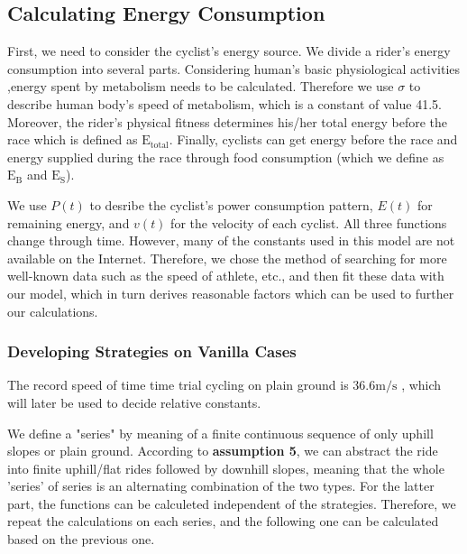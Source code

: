 \documentclass[12pt]{article}
\theoremstyle{definition}
\theoremstyle{remark}
\numberwithin{equation}{section}
\begin{document}
	\subsection{Calculating Energy Consumption}
	First, we need to consider the cyclist's energy source. We divide a rider's energy consumption into several parts. Considering human's basic physiological activities ,energy spent by metabolism needs to be calculated. Therefore we use $\sigma$ to describe human body's speed of metabolism, which is a constant of value 41.5. Moreover, the rider's physical fitness determines his/her total energy before the race which is defined as $\mathrm{E}_\mathrm{total}$. Finally, cyclists can get energy before the race and energy supplied during the race through food consumption (which we define as $\mathrm{E}_\mathrm{B}$ and $\mathrm{E}_\mathrm{S}$). 

	We use $P(t)$ to desribe the cyclist's power consumption pattern, $E(t)$ for remaining energy, and $v(t)$ for the velocity of each cyclist. All three functions change through time. However, many of the constants used in this model are not available on the Internet. Therefore, we chose the method of searching for more well-known data such as the speed of athlete, etc., and then fit these data with our model, which in turn derives reasonable factors which can be used to further our calculations.

	\subsubsection{Developing Strategies on Vanilla Cases}
	The record speed of time time trial cycling on plain ground is 36.6$\mathrm{m/s}$ \cite{time trial record}, which will later be used to decide relative constants.

	We define a "series" by meaning of a finite continuous sequence of only uphill slopes or plain ground. According to \textbf{assumption 5}, we can abstract the ride into finite uphill/flat rides followed by downhill slopes, meaning that the whole 'series' of series is an alternating combination of the two types. For the latter part, the functions can be calculeted independent of the strategies. Therefore, we repeat the calculations on each series, and the following one can be calculated based on the previous one.
\end{document}
